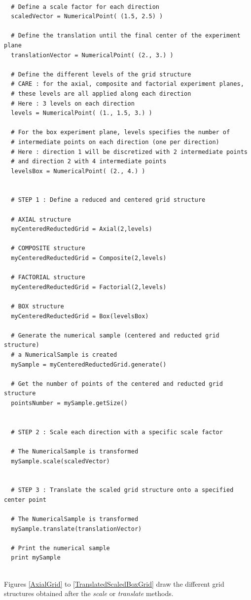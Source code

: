 \begin{lstlisting}

  # Define a scale factor for each direction
  scaledVector = NumericalPoint( (1.5, 2.5) )

  # Define the translation until the final center of the experiment plane
  translationVector = NumericalPoint( (2., 3.) )

  # Define the different levels of the grid structure
  # CARE : for the axial, composite and factorial experiment planes,
  # these levels are all applied along each direction
  # Here : 3 levels on each direction
  levels = NumericalPoint( (1., 1.5, 3.) )

  # For the box experiment plane, levels specifies the number of
  # intermediate points on each direction (one per direction)
  # Here : direction 1 will be discretized with 2 intermediate points
  # and direction 2 with 4 intermediate points
  levelsBox = NumericalPoint( (2., 4.) )


  # STEP 1 : Define a reduced and centered grid structure

  # AXIAL structure
  myCenteredReductedGrid = Axial(2,levels)

  # COMPOSITE structure
  myCenteredReductedGrid = Composite(2,levels)

  # FACTORIAL structure
  myCenteredReductedGrid = Factorial(2,levels)

  # BOX structure
  myCenteredReductedGrid = Box(levelsBox)

  # Generate the numerical sample (centered and reducted grid structure)
  # a NumericalSample is created
  mySample = myCenteredReductedGrid.generate()

  # Get the number of points of the centered and reducted grid structure
  pointsNumber = mySample.getSize()


  # STEP 2 : Scale each direction with a specific scale factor

  # The NumericalSample is transformed
  mySample.scale(scaledVector)


  # STEP 3 : Translate the scaled grid structure onto a specified center point

  # The NumericalSample is transformed
  mySample.translate(translationVector)

  # Print the numerical sample
  print mySample
\end{lstlisting}
\textspace\\


Figures \ref{AxialGrid} to \ref{TranslatedScaledBoxGrid} draw the different grid structures obtained after the {\itshape scale} or {\itshape translate} methods.


